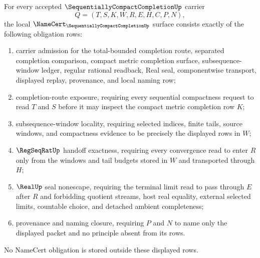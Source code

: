 \begin{theorem}
\label{thm:sequentially-compact-completion-namecert-obligations}
For every accepted $\SequentiallyCompactCompletionUp$ carrier
$$
Q=(T,S,K,W,R,E,H,C,P,N),
$$
the local $\NameCert_{\SequentiallyCompactCompletionUp}$ surface consists exactly of the following obligation rows:
\begin{enumerate}
\item carrier admission for the total-bounded completion route, separated completion comparison, compact metric completion surface, subsequence-window ledger, regular rational readback, Real seal, componentwise transport, displayed replay, provenance, and local naming row;
\item completion-route exposure, requiring every sequential compactness request to read $T$ and $S$ before it may inspect the compact metric completion row $K$;
\item subsequence-window locality, requiring selected indices, finite tails, source windows, and compactness evidence to be precisely the displayed rows in $W$;
\item $\RegSeqRatUp$ handoff exactness, requiring every convergence read to enter $R$ only from the windows and tail budgets stored in $W$ and transported through $H$;
\item $\RealUp$ seal nonescape, requiring the terminal limit read to pass through $E$ after $R$ and forbidding quotient streams, host real equality, external selected limits, countable choice, and detached ambient completeness;
\item provenance and naming closure, requiring $P$ and $N$ to name only the displayed packet and no principle absent from its rows.
\end{enumerate}
No NameCert obligation is stored outside these displayed rows.
\end{theorem}
